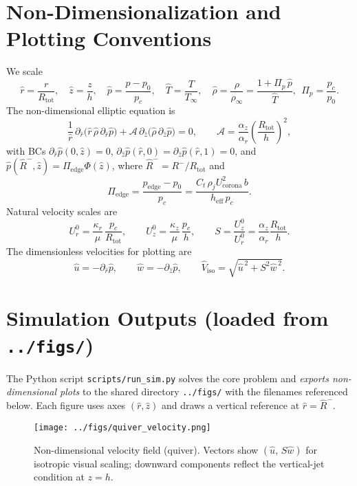\documentclass[11pt,a4paper]{article}
\begin{document}
\section{Non-Dimensionalization and Plotting Conventions}
We scale
\begin{equation}
  \hat r=\frac{r}{R_{\mathrm{tot}}},\quad
  \hat z=\frac{z}{h},\quad
  \hat p=\frac{p-p_0}{p_c},\quad
  \hat T=\frac{T}{T_\infty},\quad
  \hat\rho=\frac{\rho}{\rho_\infty}=\frac{1+\Pi_p\,\hat p}{\hat T},\ \ \Pi_p=\frac{p_c}{p_0}.
\end{equation}
The non-dimensional elliptic equation is
\begin{equation}
  \frac{1}{\hat r}\,\partial_{\hat r}\!\big(\hat r\,\hat\rho\,\partial_{\hat r}\hat p\big)
  + \mathcal{A}\,\partial_{\hat z}\!\big(\hat\rho\,\partial_{\hat z}\hat p\big)=0,\qquad
  \mathcal{A}=\frac{\alpha_z}{\alpha_r}\left(\frac{R_{\mathrm{tot}}}{h}\right)^2,
\end{equation}
with BCs $\partial_{\hat r}\hat p(0,\hat z)=0$, $\partial_{\hat z}\hat p(\hat r,0)=\partial_{\hat z}\hat p(\hat r,1)=0$, and
$\hat p(\hat R^{-},\hat z)=\Pi_{\mathrm{edge}}\Phi(\hat z)$, where $\hat R^{-}=R^{-}/R_{\mathrm{tot}}$ and
\begin{equation}
  \Pi_{\mathrm{edge}}=\frac{p_{\mathrm{edge}}-p_0}{p_c}=\frac{C_t\,\rho_j U_{\mathrm{corona}}^2\,b}{h_{\mathrm{eff}}\,p_c}.
\end{equation}
Natural velocity scales are
\begin{equation}
  U_r^0=\frac{\kappa_r}{\mu}\,\frac{p_c}{R_{\mathrm{tot}}},\qquad
  U_z^0=\frac{\kappa_z}{\mu}\,\frac{p_c}{h},\qquad
  S=\frac{U_z^0}{U_r^0}=\frac{\alpha_z}{\alpha_r}\frac{R_{\mathrm{tot}}}{h}.
\end{equation}
The dimensionless velocities for plotting are
\begin{equation}
  \hat u=-\partial_{\hat r}\hat p,\qquad
  \hat w=-\partial_{\hat z}\hat p,\qquad
  \hat V_{\mathrm{iso}}=\sqrt{\hat u^{\,2}+S^{2}\hat w^{\,2}}.
\end{equation}

\section{Simulation Outputs (loaded from \texttt{../figs/})}
The Python script \texttt{scripts/run\_sim.py} solves the core problem and \emph{exports non-dimensional plots} to the shared directory \texttt{../figs/} with the filenames referenced below. Each figure uses axes $(\hat r,\hat z)$ and draws a vertical reference at $\hat r=\hat R^{-}$.
\begin{figure}[t]
  \centering
  \texttt{[image: ../figs/quiver\_velocity.png]}
  \caption{Non-dimensional velocity field (quiver). Vectors show $(\hat u,\,S\hat w)$ for isotropic visual scaling; downward components reflect the vertical-jet condition at $z=h$.}
  \label{fig:quiver}
\end{figure}
\end{document}

